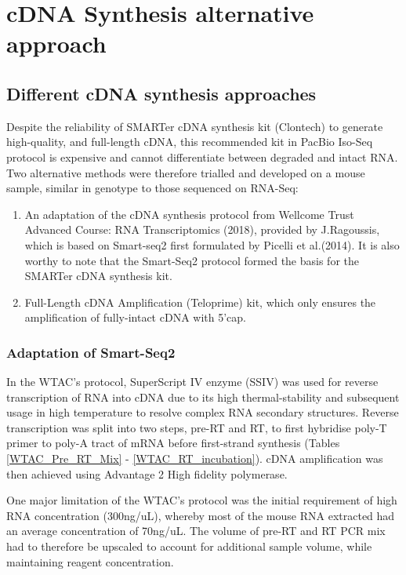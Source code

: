 \chapter{cDNA Synthesis alternative approach}\label{ch:alt_cDNA}

\section{Different cDNA synthesis approaches}
Despite the reliability of SMARTer cDNA synthesis kit (Clontech) to generate high-quality, and full-length cDNA, this recommended kit in PacBio Iso-Seq protocol is expensive and cannot differentiate between degraded and intact RNA. Two alternative methods were therefore trialled and developed on a mouse sample, similar in genotype to those sequenced on RNA-Seq:

\begin{enumerate}
	\item An adaptation of the cDNA synthesis protocol from Wellcome Trust Advanced Course: RNA Transcriptomics (2018), provided by J.Ragoussis, which is based on Smart-seq2 first formulated by Picelli et al.(2014). It is also worthy to note that the Smart-Seq2 protocol formed the basis for the SMARTer cDNA synthesis kit. 
	\item Full-Length cDNA Amplification (Teloprime) kit, which only ensures the amplification of fully-intact cDNA with 5'cap.    
\end{enumerate}

\subsection{Adaptation of Smart-Seq2}
In the WTAC's protocol, SuperScript IV enzyme (SSIV) was used for reverse transcription of RNA into cDNA due to its high thermal-stability and subsequent usage in high temperature to resolve complex RNA secondary structures. Reverse transcription was split into two steps, pre-RT and RT, to first hybridise poly-T primer to poly-A tract of mRNA before first-strand synthesis (Tables \ref{WTAC_Pre_RT_Mix} - \ref{WTAC_RT_incubation}). cDNA amplification was then achieved using Advantage 2 High fidelity polymerase.

One major limitation of the WTAC's protocol was the initial requirement of high RNA concentration (300ng/uL), whereby most of the mouse RNA extracted had an average concentration of 70ng/uL. The volume of pre-RT and RT PCR mix had to therefore be upscaled to account for additional sample volume, while maintaining reagent concentration. 



